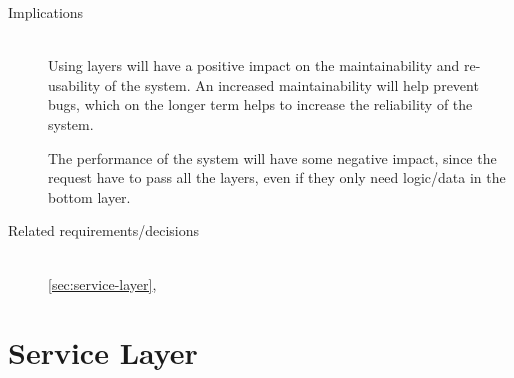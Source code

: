 \begin{description}
\item [Implications]~\\
Using layers will have a positive impact on the maintainability and re-usability of the system. An increased maintainability will help prevent bugs, which on the longer term helps to increase the reliability of the system. 

The performance of the system will have some negative impact, since the request have to pass all the layers, even if they only need logic/data in the bottom layer.

\item [Related requirements/decisions]~\\
\ref{sec:service-layer}, 

\end{description}


\section{Service Layer}


